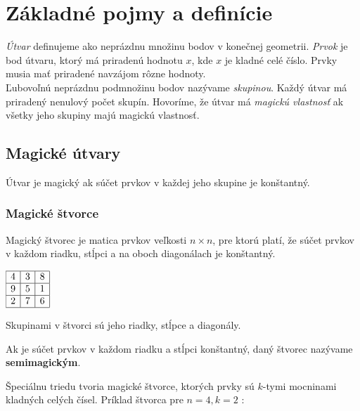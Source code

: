 \chapter{Základné pojmy a definície}

\label{kap:definitions} %

\textit{Útvar} definujeme ako neprázdnu množinu bodov v konečnej geometrii. \textit{Prvok} je bod útvaru, ktorý má priradenú hodnotu $x$, kde $x$ je kladné celé číslo. Prvky musia mať priradené navzájom rôzne hodnoty. \\

Ľubovoľnú neprázdnu podmnožinu bodov nazývame \textit{skupinou}. Každý útvar má priradený nenulový počet skupín. Hovoríme, že útvar má \textit{magickú vlastnosť} ak všetky jeho skupiny majú magickú vlastnosť.

\section{Magické útvary}
\begin{definition} Útvar je magický ak súčet prvkov v každej jeho skupine je konštantný.
\end{definition}

\subsection{Magické štvorce}
\begin{definition} Magický štvorec je matica prvkov veľkosti $n \times n$, pre ktorú platí, že súčet prvkov v každom riadku, stĺpci a na oboch diagonálach je konštantný.
\end{definition}

\begin{center}
$\begin{array}{ |c|c|c| } 
\hline
4 & 3 & 8 \\ 
\hline
9 & 5 & 1 \\ 
\hline
2 & 7 & 6 \\
\hline
\end{array}$
\end{center}

Skupinami v štvorci sú jeho riadky, stĺpce a diagonály.

\begin{note} Ak je súčet prvkov v každom riadku a stĺpci konštantný, daný štvorec nazývame \textbf{semimagickým}.
\end{note}

Špeciálnu triedu tvoria magické štvorce, ktorých prvky sú $k$-tymi mocninami kladných celých čísel. Príklad štvorca pre $n = 4, k = 2$ \cite{multimagie}:

